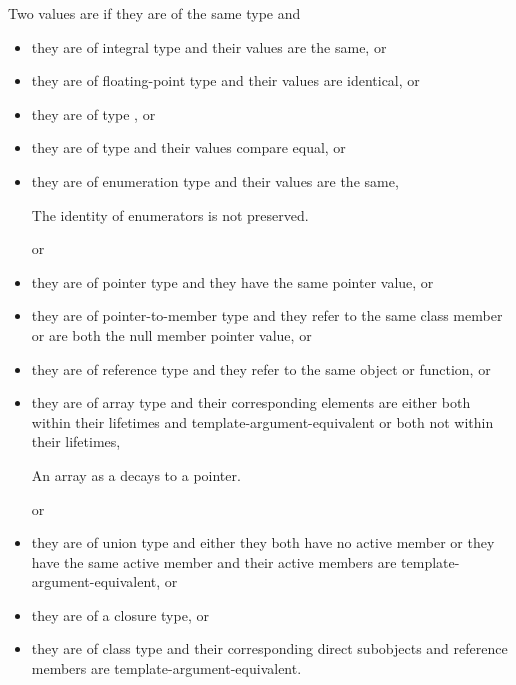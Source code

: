 \pnum
Two values are  if
they are of the same type and
\begin{itemize}
\item
they are of integral type and their values are the same, or

\item
they are of floating-point type and their values are identical, or

\item
they are of type , or

\item
they are of type  and
their values compare equal, or

\item
they are of enumeration type and their values are the same,
\begin{footnote}
The identity of enumerators is not preserved.
\end{footnote}
or

\item
they are of pointer type and they have the same pointer value, or

\item
they are of pointer-to-member type and they refer to the same class member
or are both the null member pointer value, or

\item
they are of reference type and they refer to the same object or function, or

\item
they are of array type and their corresponding elements are either
both within their lifetimes and template-argument-equivalent or
both not within their lifetimes,
\begin{footnote}
An array as a  decays to a pointer.
\end{footnote}
or

\item
they are of union type and either
they both have no active member or
they have the same active member and their active members are template-argument-equivalent, or

\item
they are of a closure type, or

\item
they are of class type and
their corresponding direct subobjects and reference members are template-argument-equivalent.
\end{itemize}

